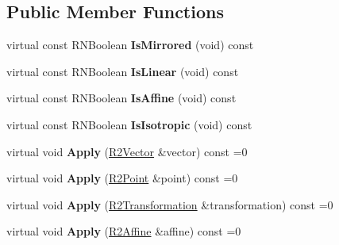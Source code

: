 \subsection*{Public Member Functions}
\begin{DoxyCompactItemize}
\item 
virtual const R\+N\+Boolean {\bfseries Is\+Mirrored} (void) const \hypertarget{class_r2_transformation_ae8e3ad90301ac17af1047679763e0ed2}{}\label{class_r2_transformation_ae8e3ad90301ac17af1047679763e0ed2}

\item 
virtual const R\+N\+Boolean {\bfseries Is\+Linear} (void) const \hypertarget{class_r2_transformation_ad61d41bf45d3da00a31b45ee0dfef022}{}\label{class_r2_transformation_ad61d41bf45d3da00a31b45ee0dfef022}

\item 
virtual const R\+N\+Boolean {\bfseries Is\+Affine} (void) const \hypertarget{class_r2_transformation_ab0f3b893e49bd3534820a14fefd1903a}{}\label{class_r2_transformation_ab0f3b893e49bd3534820a14fefd1903a}

\item 
virtual const R\+N\+Boolean {\bfseries Is\+Isotropic} (void) const \hypertarget{class_r2_transformation_a906661967eb5c6b71112cc51866600bc}{}\label{class_r2_transformation_a906661967eb5c6b71112cc51866600bc}

\item 
virtual void {\bfseries Apply} (\hyperlink{class_r2_vector}{R2\+Vector} \&vector) const  =0\hypertarget{class_r2_transformation_afc2a2082277dcebaf261b67f1e62e2e3}{}\label{class_r2_transformation_afc2a2082277dcebaf261b67f1e62e2e3}

\item 
virtual void {\bfseries Apply} (\hyperlink{class_r2_point}{R2\+Point} \&point) const  =0\hypertarget{class_r2_transformation_aac9b0f354e8fb6f94b3be2efeb72c967}{}\label{class_r2_transformation_aac9b0f354e8fb6f94b3be2efeb72c967}

\item 
virtual void {\bfseries Apply} (\hyperlink{class_r2_transformation}{R2\+Transformation} \&transformation) const  =0\hypertarget{class_r2_transformation_adb15b45eb1a3ab9a5eda20514136a0bc}{}\label{class_r2_transformation_adb15b45eb1a3ab9a5eda20514136a0bc}

\item 
virtual void {\bfseries Apply} (\hyperlink{class_r2_affine}{R2\+Affine} \&affine) const  =0\hypertarget{class_r2_transformation_a01b79abf84878148f5630b6893a516e6}{}\label{class_r2_transformation_a01b79abf84878148f5630b6893a516e6}


\end{DoxyCompactItemize}
